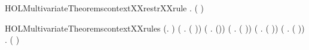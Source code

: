 \newcommand{\HOLMultivariateTheoremscontextXXrestrXXrewrite}{\UseVerbatim{HOLMultivariateTheoremscontextXXrestrXXrewrite}}
\begin{SaveVerbatim}{HOLMultivariateTheoremscontextXXrestrXXrule}
\HOLTokenTurnstile{} \HOLSymConst{\HOLTokenForall{}}  .    \HOLSymConst{\HOLTokenImp{}}   (\HOLConst{\ensuremath{\nu}}  )
\end{SaveVerbatim}
\newcommand{\HOLMultivariateTheoremscontextXXrestrXXrule}{\UseVerbatim{HOLMultivariateTheoremscontextXXrestrXXrule}}
\begin{SaveVerbatim}{HOLMultivariateTheoremscontextXXrules}
\HOLTokenTurnstile{} (\HOLSymConst{\HOLTokenForall{}}.   ) \HOLSymConst{\HOLTokenConj{}} (\HOLSymConst{\HOLTokenForall{}} .   ( )) \HOLSymConst{\HOLTokenConj{}}
   (\HOLSymConst{\HOLTokenForall{}}  .    \HOLSymConst{\HOLTokenImp{}}   ()) \HOLSymConst{\HOLTokenConj{}}
   (\HOLSymConst{\HOLTokenForall{}}  .
           \HOLSymConst{\HOLTokenConj{}}    \HOLSymConst{\HOLTokenImp{}}   ( \HOLSymConst{\ensuremath{+}} )) \HOLSymConst{\HOLTokenConj{}}
   (\HOLSymConst{\HOLTokenForall{}}  .
           \HOLSymConst{\HOLTokenConj{}}    \HOLSymConst{\HOLTokenImp{}}   ( \HOLSymConst{\ensuremath{\parallel}} )) \HOLSymConst{\HOLTokenConj{}}
   (\HOLSymConst{\HOLTokenForall{}}  .    \HOLSymConst{\HOLTokenImp{}}   (\HOLConst{\ensuremath{\nu}}  )) \HOLSymConst{\HOLTokenConj{}}
   \HOLSymConst{\HOLTokenForall{}}  .    \HOLSymConst{\HOLTokenImp{}}   (  )
\end{SaveVerbatim}
